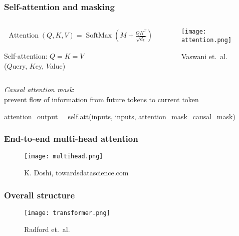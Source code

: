 \documentclass[17pt,institute=e10]{tuhh_presentation}
\begin{document}
\begin{frame}[fragile]
\frametitle{Self-attention and masking}
  \vspace{-1.5cm}
\begin{columns}[c]
\begin{column}{0.6\textwidth}
  \begin{align*}
    \operatorname{Attention}(Q,K,V) = \operatorname{SoftMax}\left(M + \frac{Q K^T}{\sqrt{d_k}} \right) V \in \mathbb{R}^{s_q \times d_v}
  \end{align*}

\vspace{2cm}

Self-attention: $Q = K = V$ \\
($Q$uery, $K$ey, $V$alue)
\end{column}
\begin{column}{0.4\textwidth}
    \begin{figure}
        \texttt{[image: attention.png]}
        \caption{Vaswani et.\ al.}
    \end{figure}      
\end{column}
\end{columns}
\pause
\vspace{-0.5cm}
\emph{Causal attention mask}: \\
prevent flow of information from future tokens to current token

\vspace{1cm}

  \begin{python}
    attention_output = self.att(inputs, inputs, attention_mask=causal_mask)
  \end{python}
\end{frame}

\begin{frame}
  \frametitle{End-to-end multi-head attention}
  \vspace{-1cm}
    \begin{figure}
    \centering
    \texttt{[image: multihead.png]}
    \caption{K. Doshi, towardsdatascience.com}
  \end{figure}
\end{frame}

\begin{frame}
  \frametitle{Overall structure}
  \vspace{-1cm}
    \begin{figure}
    \centering
    \texttt{[image: transformer.png]}
    \caption{Radford et.\ al.}
  \end{figure}
\end{frame}
\end{document}
